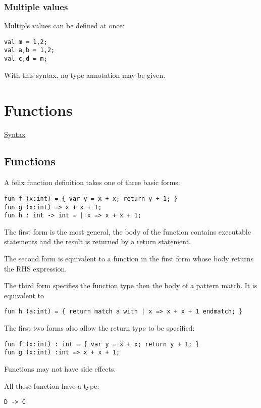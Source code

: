 \documentclass[oneside]{book}
\begin{document}
\subsection{Multiple values}
Multipls values can be defined at once:

\begin{verbatim}
val m = 1,2;
val a,b = 1,2;
val c,d = m;
\end{verbatim}

With this syntax, no type annotation may be given.


\chapter{Functions }
\href{http://felix-lang.org/share/lib/grammar/functions.fsyn}{Syntax}

\section{Functions }
A felix function definition takes one of three basic forms:

\begin{verbatim}
fun f (x:int) = { var y = x + x; return y + 1; }
fun g (x:int) => x + x + 1;
fun h : int -> int = | x => x + x + 1;
\end{verbatim}

The first form is the most general, the body 
of the function contains executable statements
and the result is returned by a return statement.

The second form is equivalent to a function in the first
form whose body returns the RHS expression.

The third form specifies the function type then the
body of a pattern match. It is equivalent to

\begin{verbatim}
fun h (a:int) = { return match a with | x => x + x + 1 endmatch; }
\end{verbatim}

The first two forms also allow the return type to be
specified:

\begin{verbatim}
fun f (x:int) : int = { var y = x + x; return y + 1; }
fun g (x:int) :int => x + x + 1;
\end{verbatim}


Functions may not have side effects.

All these function have a type:

\begin{verbatim}
D -> C
\end{verbatim}
\end{document}
